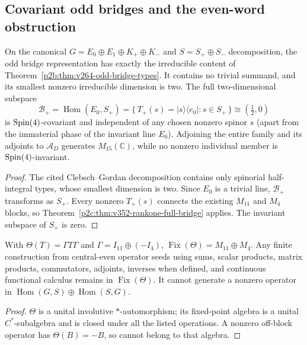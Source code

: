 \documentclass[12pt,a4paper]{article}
\begin{document}
\subsection{Covariant odd bridges and the even-word obstruction}
\label{p2d:sec:v352-odd-port}
\begin{corollary}
\label{p2d:cor:v352-minimal-covariant-port}
On the canonical $G=E_0\oplus E_1\oplus K_+\oplus K_-$ and
$S=S_+\oplus S_-$ decomposition, the odd bridge representation has
exactly the irreducible content of
Theorem~\ref{p2b:thm:v264-odd-bridge-types}.  It contains no
trivial summand, and its smallest nonzero irreducible dimension is
two.  The full two-dimensional subspace
\[
 \mathcal B_+=\operatorname{Hom}(E_0,S_+)
 =\bigl\{\,T_+(s)=|s\rangle\langle e_0|:s\in S_+\,\bigr\}
 \cong (\tfrac12,0)
\]
is $\mathrm{Spin}(4)$-covariant and independent of any chosen nonzero
spinor $s$ (apart from the immaterial phase of the invariant line
$E_0$).  Adjoining the entire family and its adjoints to
$\mathcal A_D$ generates $M_{15}(\mathbb C)$, while no
nonzero individual member is $\mathrm{Spin}(4)$-invariant.
\end{corollary}
\begin{proof}
The cited Clebsch--Gordan decomposition contains only spinorial
half-integral types, whose smallest dimension is two.
Since $E_0$ is a trivial line, $\mathcal B_+$ transforms as
$S_+$.  Every nonzero $T_+(s)$ connects the existing
$M_{11}$ and $M_4$ blocks, so
Theorem~\ref{p2c:thm:v352-rankone-full-bridge} applies.
The invariant subspace of $S_+$ is zero.
\end{proof}

\begin{theorem}
\label{p2d:thm:v352-even-word-no-go}
With $\Theta(T)=\Gamma T\Gamma$ and
$\Gamma=I_{11}\oplus(-I_4)$,
$\operatorname{Fix}(\Theta)=M_{11}\oplus M_4$.
Any finite construction from central-even operator seeds using
sums, scalar products, matrix products, commutators, adjoints,
inverses when defined, and continuous functional calculus remains
in $\operatorname{Fix}(\Theta)$.  It cannot generate a nonzero
operator in
$\operatorname{Hom}(G,S)\oplus\operatorname{Hom}(S,G)$.
\end{theorem}
\begin{proof}
$\Theta$ is a unital involutive $*$-automorphism; its fixed-point
algebra is a unital $C^*$-subalgebra and is closed under all the
listed operations.  A nonzero off-block operator has
$\Theta(B)=-B$, so cannot belong to that algebra.
\end{proof}
\end{document}
